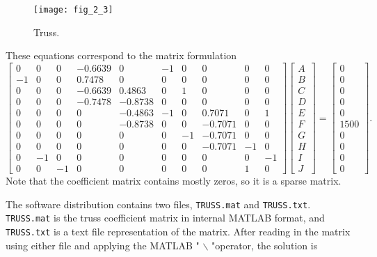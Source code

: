 \documentclass[../main.tex]{subfiles}
\begin{document}
\begin{figure}
	\centering
	\texttt{[image: fig\_2\_3]}
	\caption{ Truss.}
	\label{fig:fig_2_3}
\end{figure}
These equations correspond to the matrix formulation
$$\left[\begin{array}{cccccccccc}0 & 0 & 0 & -0.6639 & 0 & -1 & 0 & 0 & 0 & 0 \\ -1 & 0 & 0 & 0.7478 & 0 & 0 & 0 & 0 & 0 & 0 \\ 0 & 0 & 0 & -0.6639 & 0.4863 & 0 & 1 & 0 & 0 & 0 \\ 0 & 0 & 0 & -0.7478 & -0.8738 & 0 & 0 & 0 & 0 & 0 \\ 0 & 0 & 0 & 0 & -0.4863 & -1 & 0 & 0.7071 & 0 & 1 \\ 0 & 0 & 0 & 0 & -0.8738 & 0 & 0 & -0.7071 & 0 & 0 \\ 0 & 0 & 0 & 0 & 0 & 0 & -1 & -0.7071 & 0 & 0 \\ 0 & 0 & 0 & 0 & 0 & 0 & 0 & -0.7071 & -1 & 0 \\ 0 & -1 & 0 & 0 & 0 & 0 & 0 & 0 & 0 & -1 \\ 0 & 0 & -1 & 0 & 0 & 0 & 0 & 0 & 1 & 0\end{array}\right]\left[\begin{array}{l}A \\ B \\ C \\ D \\ E \\ F \\ G \\ H \\ I \\ J\end{array}\right]=\left[\begin{array}{l}0 \\ 0 \\ 0 \\ 0 \\ 0 \\ 1500 \\ 0 \\ 0 \\ 0 \\ 0\end{array}\right] .$$
Note that the coefficient matrix contains mostly zeros, so it is a sparse matrix.

The software distribution contains two files, \texttt{TRUSS.mat} and \texttt{TRUSS.txt}. \texttt{TRUSS.mat} is the truss coefficient matrix in internal MATLAB format, and \texttt{TRUSS.txt} is a text file representation of the matrix. After reading in the matrix using either file and applying the MATLAB " $\backslash$ "operator, the solution is
\end{document}
